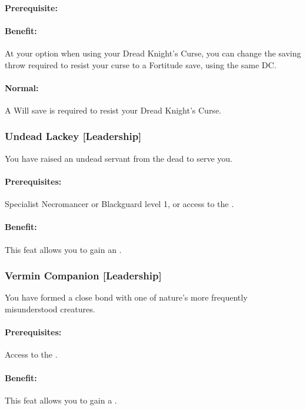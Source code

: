 \paragraph{Prerequisite:} 
\paragraph{Benefit:} At your option when using your Dread Knight's Curse, you can change the saving throw required to resist your curse to a Fortitude save, using the same DC.
\paragraph{Normal:} A Will save is required to resist your Dread Knight's Curse.

\subsubsection[Undead Lackey]{Undead Lackey [Leadership]}
\label{Feat:UndeadLackey}
You have raised an undead servant from the dead to serve you.

\paragraph{Prerequisites:} Specialist Necromancer or Blackguard level 1, or access to the .

\paragraph{Benefit:} This feat allows you to gain an .

\subsubsection[Vermin Companion]{Vermin Companion [Leadership]}
\label{Feat:VerminCompanion}
You have formed a close bond with one of nature's more frequently misunderstood creatures.

\paragraph{Prerequisites:} Access to the .

\paragraph{Benefit:} This feat allows you to gain a .

